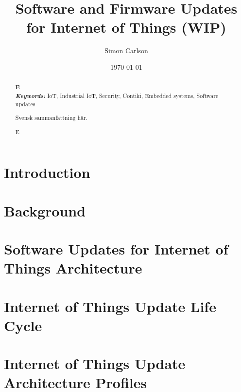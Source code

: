 \documentclass{kththesis}
\title{Software and Firmware Updates for Internet of Things (WIP)}
\author{Simon Carlson}
\date{\today}
\providecommand{\keywords}[1]{\textbf{\textit{Keywords:}} #1}
\begin{document}
\frontmatter

\titlepage

\begin{abstract}
\textbf{E}\\


\noindent\keywords{IoT, Industrial IoT, Security, Contiki, Embedded systems, 
                    Software updates}
\end{abstract}

\begin{otherlanguage}{swedish}
    \begin{abstract}
        Svensk sammanfattning här.
    \end{abstract}
\end{otherlanguage}


\renewcommand{\abstractname}{Acknowledgements}
\begin{abstract}
    E
\end{abstract}

\tableofcontents
\listoftables
\listoffigures
\printglossaries

\mainmatter


\chapter{Introduction}


\chapter{Background}


\chapter{Software Updates for Internet of Things Architecture}


\chapter{Internet of Things Update Life Cycle}


\chapter{Internet of Things Update\\Architecture Profiles}


\printbibliography[heading=bibintoc] %


\end{document}
